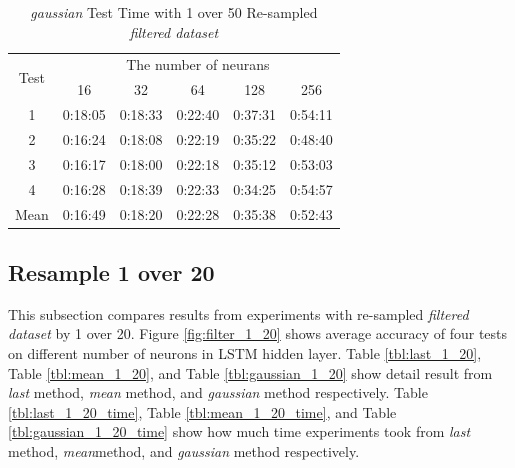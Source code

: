 \documentclass[draft,dvipsnames]{drexel-thesis}
\begin{document}
\begin{thesis}
\begin{table}[!t]
\centering
\caption{{\em gaussian} Test Time with 1 over 50 Re-sampled {\em filtered dataset}}
\label{tbl:gaussian_1_50_time}
\begin{tabular}{|c|c|c|c|c|c|}
\hline
\multirow{2}{*}{Test}      & \multicolumn{5}{c|}{The number of neurans}                                                                                                               \\ \cline{2-6} 
                           & 16                           & 32                           & 64                           & 128                          & 256                          \\ \hline
1                          & 0:18:05                      & 0:18:33                      & 0:22:40                      & 0:37:31                      & 0:54:11                      \\ \hline
2                          & 0:16:24                      & 0:18:08                      & 0:22:19                      & 0:35:22                      & 0:48:40                      \\ \hline
3                          & 0:16:17                      & 0:18:00                      & 0:22:18                      & 0:35:12                      & 0:53:03                      \\ \hline
4                          & 0:16:28                      & 0:18:39                      & 0:22:33                      & 0:34:25                      & 0:54:57                      \\ \hline
\multicolumn{1}{|l|}{Mean} & \multicolumn{1}{l|}{0:16:49} & \multicolumn{1}{l|}{0:18:20} & \multicolumn{1}{l|}{0:22:28} & \multicolumn{1}{l|}{0:35:38} & \multicolumn{1}{l|}{0:52:43} \\ \hline
\end{tabular}
\end{table}


\subsection{Resample 1 over 20}
This subsection compares results from experiments with re-sampled {\em filtered dataset} by 1 over 20. Figure \ref{fig:filter_1_20} shows average accuracy of four tests on different number of neurons in LSTM hidden layer. Table \ref{tbl:last_1_20}, Table \ref{tbl:mean_1_20}, and Table \ref{tbl:gaussian_1_20} show detail result from {\em last} method, {\em mean} method, and {\em gaussian} method respectively. Table \ref{tbl:last_1_20_time}, Table \ref{tbl:mean_1_20_time}, and Table \ref{tbl:gaussian_1_20_time} show how much time experiments took from {\em last} method, {\em mean}method, and {\em gaussian} method respectively.


\end{thesis}
\end{document}

